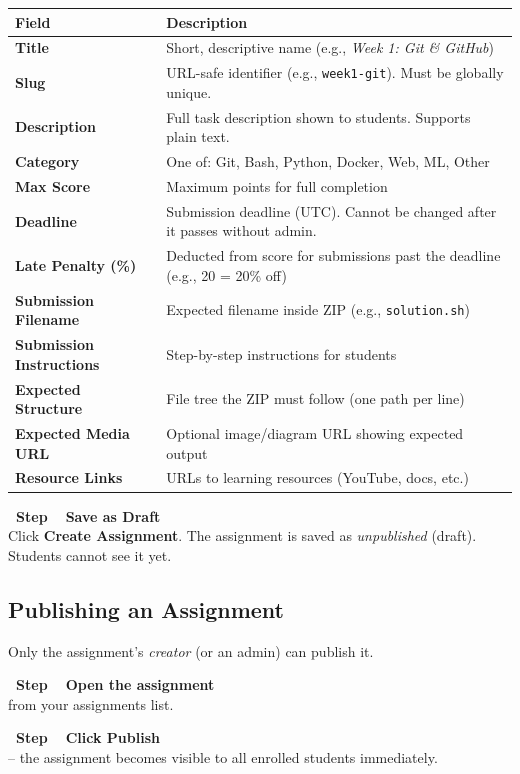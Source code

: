 \documentclass[12pt,a4paper]{article}
\newcounter{stepnum}
\newcommand{\step}[1]{%
  \stepcounter{stepnum}%
  \vspace{6pt}%
  \noindent\colorbox{mentorPurple}{\color{white}\bfseries\small\ Step \thestepnum\ }%
  \hspace{4pt}\textbf{#1}\\[4pt]%
}
\begin{document}
\begin{center}
\begin{tabularx}{\linewidth}{>{\bfseries}lX}
\toprule
Field & Description \\
\midrule
Title                   & Short, descriptive name (e.g., \textit{Week 1: Git \& GitHub}) \\
Slug                    & URL-safe identifier (e.g., \texttt{week1-git}). Must be globally unique. \\
Description             & Full task description shown to students. Supports plain text. \\
Category                & One of: Git, Bash, Python, Docker, Web, ML, Other \\
Max Score               & Maximum points for full completion \\
Deadline                & Submission deadline (UTC). Cannot be changed after it passes without admin. \\
Late Penalty (\%)       & Deducted from score for submissions past the deadline (e.g., 20 = 20\% off) \\
Submission Filename     & Expected filename inside ZIP (e.g., \texttt{solution.sh}) \\
Submission Instructions & Step-by-step instructions for students \\
Expected Structure      & File tree the ZIP must follow (one path per line) \\
Expected Media URL      & Optional image/diagram URL showing expected output \\
Resource Links          & URLs to learning resources (YouTube, docs, etc.) \\
\bottomrule
\end{tabularx}
\end{center}

\step{Save as Draft}
Click \textbf{Create Assignment}. The assignment is saved as \emph{unpublished} (draft). Students cannot see it yet.

\subsection{Publishing an Assignment}

Only the assignment's \emph{creator} (or an admin) can publish it.

\setcounter{stepnum}{0}

\step{Open the assignment} from your assignments list.

\step{Click Publish} -- the assignment becomes visible to all enrolled students immediately.
\end{document}

